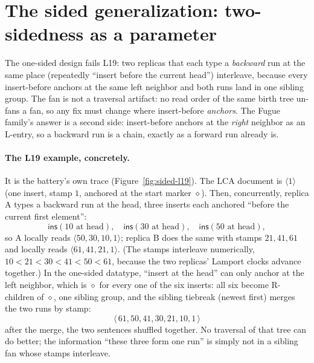 \documentclass[11pt]{article}
\newcommand{\ins}{\mathsf{ins}}
\begin{document}
\section{The sided generalization: two-sidedness as a parameter}
\label{sec:sided}

The one-sided design fails L19: two replicas that each type a
\emph{backward} run at the same place (repeatedly ``insert before the
current head'') interleave, because every insert-before anchors at the
same left neighbor and both runs land in one sibling group. The fan is
not a traversal artifact: no read order of the same birth tree un-fans
a fan, so any fix must change where insert-before \emph{anchors}. The
Fugue family's answer is a second side: insert-before anchors at the
\emph{right} neighbor as an L-entry, so a backward run is a chain,
exactly as a forward run already is.

\paragraph{The L19 example, concretely.} It is the battery's own trace
(Figure~\ref{fig:sided-l19}). The LCA document is $\langle 1 \rangle$
(one insert, stamp $1$, anchored at the start marker $\diamond$). Then,
concurrently, replica A types a backward run at the head, three
inserts each anchored ``before the current first element'':
\[
  \ins(10 \text{ at head}),\quad \ins(30 \text{ at head}),\quad
  \ins(50 \text{ at head}),
\]
so A locally reads $\langle 50, 30, 10, 1 \rangle$; replica B does the
same with stamps $21, 41, 61$ and locally reads
$\langle 61, 41, 21, 1 \rangle$. (The stamps interleave numerically,
$10 < 21 < 30 < 41 < 50 < 61$, because the two replicas' Lamport
clocks advance together.) In the one-sided datatype, ``insert at the
head'' can only anchor at the left neighbor, which is $\diamond$ for
every one of the six inserts: all six become R-children of $\diamond$,
one sibling group, and the sibling tiebreak (newest first) merges the
two runs by stamp:
\[
  \langle\, 61, 50, 41, 30, 21, 10, 1 \,\rangle
\]
after the merge, the two sentences shuffled together. No traversal of
that tree can do better; the information ``these three form one run''
is simply not in a sibling fan whose stamps interleave.
\end{document}

